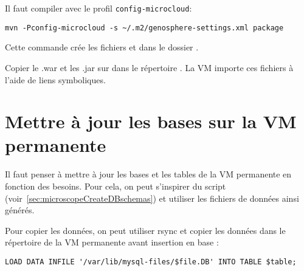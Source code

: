 Il faut compiler  avec le profil \texttt{config-microcloud}:
\begin{lstlisting}[style=bash]
mvn -Pconfig-microcloud -s ~/.m2/genosphere-settings.xml package
\end{lstlisting}
Cette commande crée les fichiers  et 
dans le dossier .

Copier le .war et les .jar sur  dans le répertoire .
La VM  importe ces fichiers à l'aide de liens symboliques.

\section{Mettre à jour les bases sur la VM permanente} \label{sec:maj_vm_permanente}

Il faut penser à mettre à jour les bases et les tables de la VM permanente en fonction des besoins.
Pour cela, on peut s'inspirer du script  (voir~\autoref{sec:microscopeCreateDBschemas})
et utiliser les fichiers de données ainsi générés.

Pour copier les données, on peut utiliser rsync et copier les données dans le répertoire  de la VM permanente avant insertion en base :
\begin{lstlisting}[style=SQL]
LOAD DATA INFILE '/var/lib/mysql-files/$file.DB' INTO TABLE $table;
\end{lstlisting}
